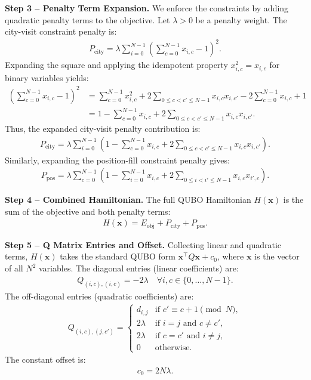 \documentclass[12pt]{article}
\begin{document}
\textbf{Step 3 -- Penalty Term Expansion.} We enforce the constraints by adding quadratic penalty terms to the objective. Let $\lambda > 0$ be a penalty weight. The city-visit constraint penalty is:
\begin{align}
P_{\text{city}} = \lambda \sum_{i=0}^{N-1} \left( \sum_{c=0}^{N-1} x_{i,c} - 1 \right)^2.
\end{align}
Expanding the square and applying the idempotent property $x_{i,c}^2 = x_{i,c}$ for binary variables yields:
\begin{align}
\left( \sum_{c=0}^{N-1} x_{i,c} - 1 \right)^2 &= \sum_{c=0}^{N-1} x_{i,c}^2 + 2 \sum_{0 \le c < c' \le N-1} x_{i,c} x_{i,c'} - 2 \sum_{c=0}^{N-1} x_{i,c} + 1 \nonumber \\
&= 1 - \sum_{c=0}^{N-1} x_{i,c} + 2 \sum_{0 \le c < c' \le N-1} x_{i,c} x_{i,c'}.
\end{align}
Thus, the expanded city-visit penalty contribution is:
\begin{align}
P_{\text{city}} = \lambda \sum_{i=0}^{N-1} \left( 1 - \sum_{c=0}^{N-1} x_{i,c} + 2 \sum_{0 \le c < c' \le N-1} x_{i,c} x_{i,c'} \right).
\end{align}
Similarly, expanding the position-fill constraint penalty gives:
\begin{align}
P_{\text{pos}} = \lambda \sum_{c=0}^{N-1} \left( 1 - \sum_{i=0}^{N-1} x_{i,c} + 2 \sum_{0 \le i < i' \le N-1} x_{i,c} x_{i',c} \right).
\end{align}

\textbf{Step 4 -- Combined Hamiltonian.} The full QUBO Hamiltonian $H(\mathbf{x})$ is the sum of the objective and both penalty terms:
\begin{align}
H(\mathbf{x}) = E_{\text{obj}} + P_{\text{city}} + P_{\text{pos}}.
\end{align}

\textbf{Step 5 -- Q Matrix Entries and Offset.} Collecting linear and quadratic terms, $H(\mathbf{x})$ takes the standard QUBO form $\mathbf{x}^\top Q \mathbf{x} + c_0$, where $\mathbf{x}$ is the vector of all $N^2$ variables. The diagonal entries (linear coefficients) are:
\begin{align}
Q_{(i,c),(i,c)} = -2\lambda \quad \forall i,c \in \{0, \dots, N-1\}.
\end{align}
The off-diagonal entries (quadratic coefficients) are:
\begin{align}
Q_{(i,c),(j,c')} = 
\begin{cases} 
d_{i,j} & \text{if } c' \equiv c+1 \pmod N, \\
2\lambda & \text{if } i=j \text{ and } c \neq c', \\
2\lambda & \text{if } c=c' \text{ and } i \neq j, \\
0 & \text{otherwise}.
\end{cases}
\end{align}
The constant offset is:
\begin{align}
c_0 = 2N\lambda.
\end{align}
\end{document}
